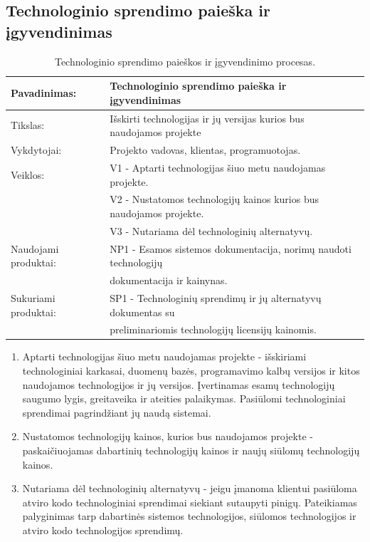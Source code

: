 \documentclass{VUMIFPSkursinis}
\begin{document}
	\subsection{Technologinio sprendimo paieška ir įgyvendinimas}

		\begin{center}
			\begin{table}[ht]
				\caption{Technologinio sprendimo paieškos ir įgyvendinimo procesas.}
					\begin{tabular}{ | l | l | } 
						\hline
							Pavadinimas:         & Technologinio sprendimo paieška ir įgyvendinimas                                      \\ \hline
							Tikslas: 	           & Išskirti technologijas ir jų versijas kurios bus naudojamos projekte 							\\ \hline
							Vykdytojai:          & Projekto vadovas, klientas, programuotojas.                             \\ \hline
							Veiklos:             & V1 - Aptarti technologijas šiuo metu naudojamas projekte. 													\\
											 & V2 - Nustatomos technologijų kainos kurios bus naudojamos projekte. \\
											 & V3 - Nutariama dėl technologinių alternatyvų.													\\ \hline
							Naudojami produktai: & NP1 - Esamos sistemos dokumentacija, norimų naudoti technologijų \\& dokumentacija ir kainynas. 													 \\ \hline
							Sukuriami produktai: & SP1 - Technologinių sprendimų ir jų alternatyvų dokumentas su \\& preliminariomis technologijų licensijų kainomis. 								\\ \hline
					\end{tabular}
			\end{table}
		\end{center}

\begin{enumerate}
	\item{Aptarti technologijas šiuo metu naudojamas projekte - išskiriami technologiniai karkasai, duomenų bazės, programavimo kalbų versijos ir kitos naudojamos technologijos ir jų versijos.
	Įvertinamas esamų technologijų saugumo lygis, greitaveika ir ateities palaikymas. 
	Pasiūlomi technologiniai sprendimai pagrindžiant jų naudą sistemai.}
	\item{Nustatomos technologijų kainos, kurios bus naudojamos projekte - paskaičiuojamas dabartinių technologijų kainos ir naujų siūlomų technologijų kainos.}
	\item{Nutariama dėl technologinių alternatyvų - jeigu įmanoma klientui pasiūloma atviro kodo technologiniai sprendimai siekiant sutaupyti pinigų. 
		Pateikiamas palyginimas tarp dabartinės sistemos technologijos, siūlomos technologijos ir atviro kodo technologijos sprendimų. }
\end{enumerate}
\end{document}
